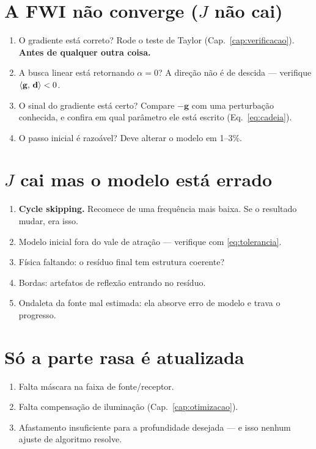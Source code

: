 \documentclass[11pt,a4paper,oneside]{report}
\begin{document}
\section{A FWI n\~ao converge ($J$ n\~ao cai)}
\begin{enumerate}[leftmargin=*]
\item O gradiente est\'a correto? Rode o teste de Taylor
(Cap.~\ref{cap:verificacao}). \textbf{Antes de qualquer outra coisa.}
\item A busca linear est\'a retornando $\alpha = 0$? A dire\c{c}\~ao n\~ao \'e
de descida --- verifique $\langle \mathbf{g},\,\mathbf{d}\rangle < 0$.
\item O sinal do gradiente est\'a certo? Compare $-\mathbf{g}$ com uma
perturba\c{c}\~ao conhecida, e confira em qual par\^ametro ele est\'a escrito
(Eq.~\ref{eq:cadeia}).
\item O passo inicial \'e razo\'avel? Deve alterar o modelo em 1--3\%.
\end{enumerate}

\section{$J$ cai mas o modelo est\'a errado}
\begin{enumerate}[leftmargin=*]
\item \textbf{Cycle skipping.} Recomece de uma frequ\^encia mais baixa. Se o
resultado mudar, era isso.
\item Modelo inicial fora do vale de atra\c{c}\~ao --- verifique com
\eqref{eq:tolerancia}.
\item F\'isica faltando: o res\'iduo final tem estrutura coerente?
\item Bordas: artefatos de reflex\~ao entrando no res\'iduo.
\item Ondaleta da fonte mal estimada: ela absorve erro de modelo e trava o
progresso.
\end{enumerate}

\section{S\'o a parte rasa \'e atualizada}
\begin{enumerate}[leftmargin=*]
\item Falta m\'ascara na faixa de fonte/receptor.
\item Falta compensa\c{c}\~ao de ilumina\c{c}\~ao
(Cap.~\ref{cap:otimizacao}).
\item Afastamento insuficiente para a profundidade desejada --- e isso nenhum
ajuste de algoritmo resolve.
\end{enumerate}
\end{document}
